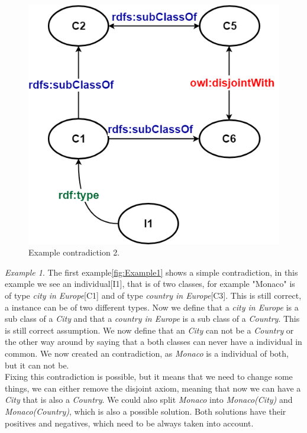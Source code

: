 \documentclass[11pt,letterpaper ,oneside ]{book}
\begin{document}
\begin{figure}
	\centering
	\includegraphics[width=\linewidth]{images/Example2.png}
	\caption{Example contradiction 2.}
	\label{fig:Example2}
\end{figure}

\textit{Example 1}. The first example\ref{fig:Example1} shows a simple contradiction, in this example we see an individual[I1], that is of two classes, for example "Monaco" is of type \textit{city in Europe}[C1] and of type \textit{country in Europe}[C3]. This is still correct, a instance can be of two different types. Now we define that a \textit{city in Europe} is a sub class of a \textit{City} and that a \textit{country in Europe} is a sub class of a \textit{Country}. This is still correct assumption. We now define that an \textit{City} can not be a \textit{Country} or the other way around by saying that a both classes can never have a individual in common. We now created an contradiction, as \textit{Monaco} is a individual of both, but it can not be.\\

Fixing this contradiction is possible, but it means that we need to change some things, we can either remove the disjoint axiom, meaning that now we can have a \textit{City} that is also a \textit{Country}. We could also split \textit{Monaco} into \textit{Monaco(City)} and \textit{Monaco(Country)}, which is also a possible solution. Both solutions have their positives and negatives, which need to be always taken into account.\\
\end{document}
